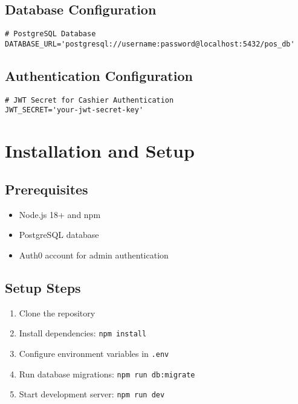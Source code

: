 \subsection{Database Configuration}
\begin{verbatim}
# PostgreSQL Database
DATABASE_URL='postgresql://username:password@localhost:5432/pos_db'
\end{verbatim}

\subsection{Authentication Configuration}
\begin{verbatim}
# JWT Secret for Cashier Authentication
JWT_SECRET='your-jwt-secret-key'
\end{verbatim}

\section{Installation and Setup}

\subsection{Prerequisites}
\begin{itemize}
  \item Node.js 18+ and npm
  \item PostgreSQL database
  \item Auth0 account for admin authentication
\end{itemize}

\subsection{Setup Steps}
\begin{enumerate}
  \item Clone the repository
  \item Install dependencies: \texttt{npm install}
  \item Configure environment variables in \texttt{.env}
  \item Run database migrations: \texttt{npm run db:migrate}
  \item Start development server: \texttt{npm run dev}
\end{enumerate}
